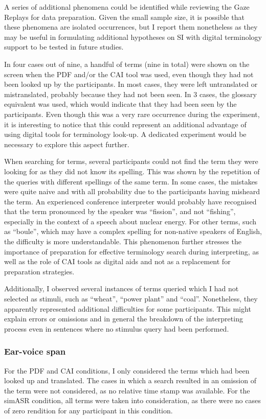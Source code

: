  \label{additional_obs}
A series of additional phenomena could be identified while reviewing the Gaze Replays for data preparation. Given the small sample size, it is possible that these phenomena are isolated occurrences, but I report them nonetheless as they may be useful in formulating additional hypotheses on SI with digital terminology support to be tested in future studies.

In four cases out of nine, a handful of terms (nine in total) were shown on the screen when the PDF and/or the CAI tool was used, even though they had not been looked up by the participants. In most cases, they were left untranslated or mistranslated, probably because they had not been seen. In 3 cases, the glossary equivalent was used, which would indicate that they had been seen by the participants. Even though this was a very rare occurrence during the experiment, it is interesting to notice that this could represent an additional advantage of using digital tools for terminology look-up. A dedicated experiment would be necessary to explore this aspect further.

When searching for terms, several participants could not find the term they were looking for as they did not know its spelling. This was shown by the repetition of the queries with different spellings of the same term. In some cases, the mistakes were quite naive and with all probability due to the participants having misheard the term. An experienced conference interpreter would probably have recognised that the term pronounced by the speaker was ``fission'', and not ``fishing'', especially in the context of a speech about nuclear energy. For other terms, such as ``boule'', which may have a complex spelling for non-native speakers of English, the difficulty is more understandable. This phenomenon further stresses the importance of preparation for effective terminology search during interpreting, as well as the role of CAI tools as digital aids and not as a replacement for preparation strategies.

Additionally, I observed several instances of terms queried which I had not selected as stimuli, such as ``wheat'', ``power plant'' and ``coal''. Nonetheless, they apparently represented additional difficulties for some participants. This might explain errors or omissions and in general the breakdown of the interpreting process even in sentences where no stimulus query had been performed.

\subsubsection{Ear-voice span} \label{EVS}
For the PDF and CAI conditions, I only considered the terms which had been looked up and translated. The cases in which a search resulted in an omission of the term were not considered, as no relative time stamp was available. For the simASR condition, all terms were taken into consideration, as there were no cases of zero rendition for any participant in this condition.

